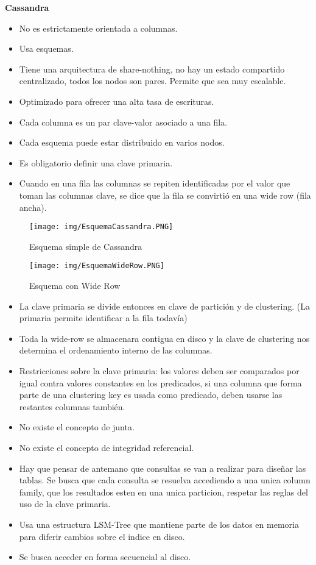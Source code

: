 \bigskip
\textbf{Cassandra}\\
\begin{itemize}
\item No es estrictamente orientada a columnas.
\item Usa esquemas.
\item Tiene una arquitectura de share-nothing, no hay un estado compartido centralizado, todos los nodos son pares. Permite que sea muy escalable.
\item Optimizado para ofrecer una alta tasa de escrituras.
\item Cada columna es un par clave-valor asociado a una fila.
\item Cada esquema puede estar distribuido en varios nodos.
\item Es obligatorio definir una clave primaria.
\item Cuando en una fila las columnas se repiten identificadas por el valor que toman las columnas clave, se dice que la fila se convirtió en una wide row (fila ancha).
\end{itemize}

\begin{figure}[!htb]
    \centering
    \texttt{[image: img/EsquemaCassandra.PNG]}
    \caption{Esquema simple de Cassandra}
\end{figure}

\begin{figure}[!htb]
    \centering
    \texttt{[image: img/EsquemaWideRow.PNG]}
    \caption{Esquema con Wide Row}
\end{figure}

\begin{itemize}
    \item La clave primaria se divide entonces en clave de partición y de clustering. (La primaria permite identificar a la fila todavía)
    \item Toda la wide-row se almacenara contigua en disco y la clave de clustering nos determina el ordenamiento interno de las columnas.
    \item Restricciones sobre la clave primaria: los valores deben ser comparados por igual contra valores constantes en los predicados, si una columna que forma parte de una clustering key es usada como predicado, deben usarse las restantes columnas también.
    \item No existe el concepto de junta.
    \item No existe el concepto de integridad referencial.
    \item Hay que pensar de antemano que consultas se van a realizar para diseñar las tablas. Se busca que cada consulta se resuelva accediendo a una unica column family, que los resultados esten en una unica particion, respetar las reglas del uso de la clave primaria.
    \item Usa una estructura LSM-Tree que mantiene parte de los datos en memoria para diferir cambios sobre el indice en disco.
    \item Se busca acceder en forma secuencial al disco.
\end{itemize}

